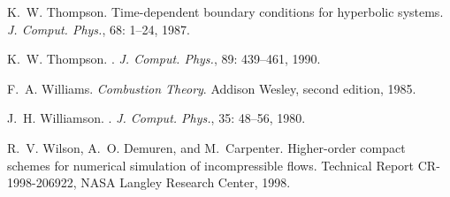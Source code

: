 \documentclass[a4paper,11pt]{book}
\begin{document}
\begin{thebibliography}{20}
K.~W. Thompson.
\newblock Time-dependent boundary conditions for hyperbolic systems.
\newblock \emph{J. Comput. Phys.}, 68: 1--24, 1987.

K.~W. Thompson.
.
\newblock \emph{J. Comput. Phys.}, 89: 439--461, 1990.

F.~A. Williams.
\newblock \emph{Combustion Theory}.
\newblock Addison Wesley, second edition, 1985.

J.~H. Williamson.
.
\newblock \emph{J. Comput. Phys.}, 35: 48--56, 1980.

R.~V. Wilson, A.~O. Demuren, and M.~Carpenter.
\newblock Higher-order compact schemes for numerical simulation of
  incompressible flows.
\newblock Technical Report CR-1998-206922, NASA Langley Research Center, 1998.

\end{thebibliography}
\end{document}
